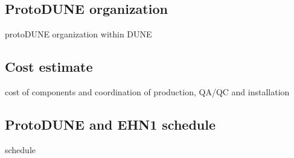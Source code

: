 
\subsection{ProtoDUNE organization}

protoDUNE organization within DUNE\\

\subsection{Cost estimate}

cost of components and coordination of production, QA/QC and installation\\

\subsection{ProtoDUNE and EHN1 schedule}

schedule\\
